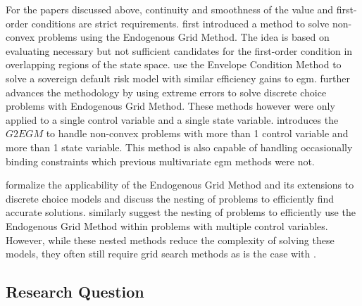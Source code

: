 \documentclass{article}
\begin{document}
For the papers discussed above, continuity and smoothness of the value and first-order conditions are strict requirements. \citet{Fella2014} first introduced a method to solve non-convex problems using the Endogenous Grid Method. The idea is based on evaluating necessary but not sufficient candidates for the first-order condition in overlapping regions of the state space. \citet{Arellano2016} use the Envelope Condition Method to solve a sovereign default risk model with similar efficiency gains to \acrshort{egm}. \citet{Iskhakov2017} further advances the methodology by using extreme errors to solve discrete choice problems with Endogenous Grid Method. These methods however were only applied to a single control variable and a single state variable. \citet{Druedahl2017} introduces the $G2EGM$ to handle non-convex problems with more than 1 control variable and more than 1 state variable. This method is also capable of handling occasionally binding constraints which previous multivariate \acrshort{egm} methods were not.

\citet{Clausen2020} formalize the applicability of the Endogenous Grid Method and its extensions to discrete choice models and discuss the nesting of problems to efficiently find accurate solutions. \citet{Druedahl2021} similarly suggest the nesting of problems to efficiently use the Endogenous Grid Method within problems with multiple control variables. However, while these nested methods reduce the complexity of solving these models, they often still require grid search methods as is the case with \citet{Druedahl2021}.


\subsection{Research Question}


\end{document}
